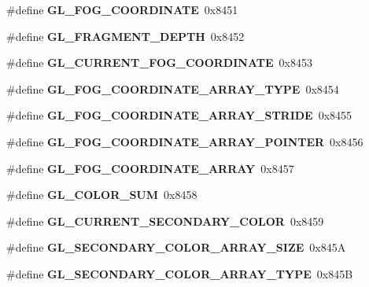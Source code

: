 \begin{DoxyCompactItemize}
\item 
\#define {\bfseries G\+L\+\_\+\+F\+O\+G\+\_\+\+C\+O\+O\+R\+D\+I\+N\+A\+T\+E}~0x8451\label{_s_d_l__opengl_8h_aa4c840736b2b88dc9b917ded6105d1b3}

\item 
\#define {\bfseries G\+L\+\_\+\+F\+R\+A\+G\+M\+E\+N\+T\+\_\+\+D\+E\+P\+T\+H}~0x8452\label{_s_d_l__opengl_8h_ae546ff0a0f2123ffb97ad0a3c9bc3448}

\item 
\#define {\bfseries G\+L\+\_\+\+C\+U\+R\+R\+E\+N\+T\+\_\+\+F\+O\+G\+\_\+\+C\+O\+O\+R\+D\+I\+N\+A\+T\+E}~0x8453\label{_s_d_l__opengl_8h_ac484320c34676d56821edb530042524a}

\item 
\#define {\bfseries G\+L\+\_\+\+F\+O\+G\+\_\+\+C\+O\+O\+R\+D\+I\+N\+A\+T\+E\+\_\+\+A\+R\+R\+A\+Y\+\_\+\+T\+Y\+P\+E}~0x8454\label{_s_d_l__opengl_8h_aa6440b6edfac2ad68e3fde151ccb8813}

\item 
\#define {\bfseries G\+L\+\_\+\+F\+O\+G\+\_\+\+C\+O\+O\+R\+D\+I\+N\+A\+T\+E\+\_\+\+A\+R\+R\+A\+Y\+\_\+\+S\+T\+R\+I\+D\+E}~0x8455\label{_s_d_l__opengl_8h_ae130784bc3a0b50a7cd3b20aaf0d1b5b}

\item 
\#define {\bfseries G\+L\+\_\+\+F\+O\+G\+\_\+\+C\+O\+O\+R\+D\+I\+N\+A\+T\+E\+\_\+\+A\+R\+R\+A\+Y\+\_\+\+P\+O\+I\+N\+T\+E\+R}~0x8456\label{_s_d_l__opengl_8h_ad2cfb69cc6d52e42b361659cc793e94d}

\item 
\#define {\bfseries G\+L\+\_\+\+F\+O\+G\+\_\+\+C\+O\+O\+R\+D\+I\+N\+A\+T\+E\+\_\+\+A\+R\+R\+A\+Y}~0x8457\label{_s_d_l__opengl_8h_a4bfc7f76d272eda015e225e0b29555ed}

\item 
\#define {\bfseries G\+L\+\_\+\+C\+O\+L\+O\+R\+\_\+\+S\+U\+M}~0x8458\label{_s_d_l__opengl_8h_ad128c4352d240ad0dbdd574fbf5c00a5}

\item 
\#define {\bfseries G\+L\+\_\+\+C\+U\+R\+R\+E\+N\+T\+\_\+\+S\+E\+C\+O\+N\+D\+A\+R\+Y\+\_\+\+C\+O\+L\+O\+R}~0x8459\label{_s_d_l__opengl_8h_a498903538395b6ff653e63d57d1a615c}

\item 
\#define {\bfseries G\+L\+\_\+\+S\+E\+C\+O\+N\+D\+A\+R\+Y\+\_\+\+C\+O\+L\+O\+R\+\_\+\+A\+R\+R\+A\+Y\+\_\+\+S\+I\+Z\+E}~0x845\+A\label{_s_d_l__opengl_8h_accbcd313b5484e96c78edf37b67b0498}

\item 
\#define {\bfseries G\+L\+\_\+\+S\+E\+C\+O\+N\+D\+A\+R\+Y\+\_\+\+C\+O\+L\+O\+R\+\_\+\+A\+R\+R\+A\+Y\+\_\+\+T\+Y\+P\+E}~0x845\+B\label{_s_d_l__opengl_8h_aa1affab18bb7c6679745f2e3bb10ad3a}


\end{DoxyCompactItemize}
